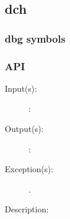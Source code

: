 %
%
%
%
%              

\label{dch}
\subsection{dch}

\subsubsection{dbg symbols}

\subsubsection{API}
\begin{description}
\label{dch_}
\item[{\cfunc[]{dch\_}{}}: ]
	\begin{description}\item[]
	\item[Input(s): ]
		\begin{description}\item[]
		\item[: ]
		\end{description}
	\item[Output(s): ]
		\begin{description}\item[]
		\item[: ]
		\end{description}
	\item[Exception(s): ]
		\begin{description}\item[]
		\item[.]
		\end{description}
	\item[Description: ]
	\end{description}
\end{description}
